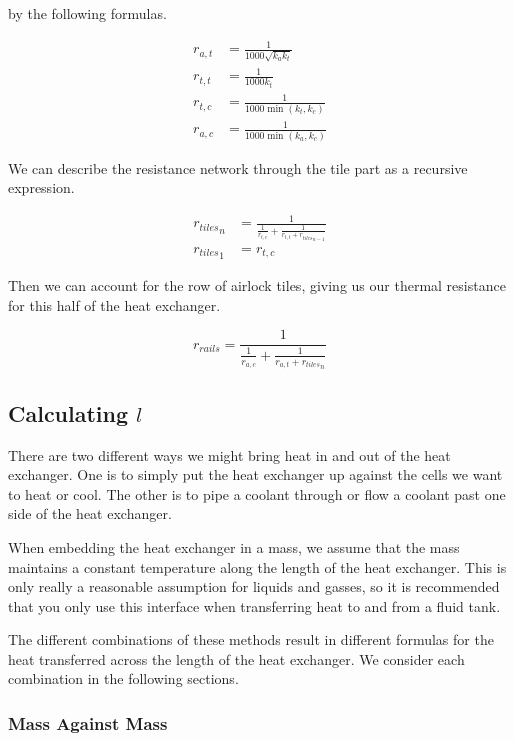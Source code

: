 \documentclass{article}
\numberwithin{equation}{subsection}
\theoremstyle{remark}
\begin{document}
by the following formulas.

\begin{align}
r_{a,t} &= \frac{1}{1000 \sqrt{k_{a} k_{t}}} \\
r_{t,t} &= \frac{1}{1000 k_{t}} \\
r_{t,c} &= \frac{1}{1000 \min \left(k_{t}, k_{c}\right)} \\
r_{a,c} &= \frac{1}{1000 \min \left(k_{a}, k_{c}\right)}
\end{align}

We can describe the resistance network through the tile part as a recursive expression.

\begin{align}
{r_{tiles}}_{n} &= \frac{1}{\frac{1}{r_{t,c}} + \frac{1}{r_{t,t} + {r_{tiles}}_{n - 1}}} \\
{r_{tiles}}_{1} &= r_{t,c}
\end{align}

Then we can account for the row of airlock tiles, giving us our thermal resistance for this half of the heat exchanger.

\begin{equation}
r_{rails} = \frac{1}{\frac{1}{r_{a,c}} + \frac{1}{r_{a,t} + {r_{tiles}}_{n}}}
\end{equation}

\subsection{Calculating \(l\)}

There are two different ways we might bring heat in and out of the heat exchanger.
One is to simply put the heat exchanger up against the cells we want to heat or cool.
The other is to pipe a coolant through or flow a coolant past one side of the heat exchanger.

When embedding the heat exchanger in a mass, we assume that the mass maintains a constant temperature along the length of the heat exchanger.
This is only really a reasonable assumption for liquids and gasses, so it is recommended that you only use this interface when transferring heat to and from a fluid tank.

The different combinations of these methods result in different formulas for the heat transferred across the length of the heat exchanger.
We consider each combination in the following sections.

\subsubsection{Mass Against Mass}
\end{document}
